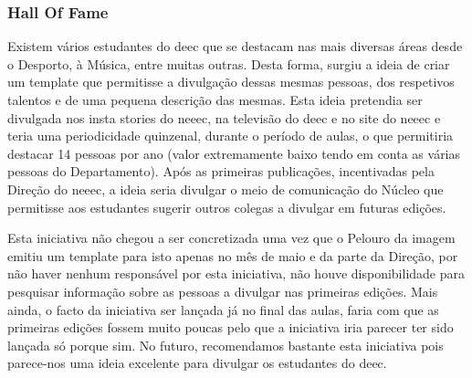 
\subsubsection{Hall Of Fame}

Existem vários estudantes do \acrshort{deec} que se destacam nas mais diversas áreas desde o Desporto, à Música, entre muitas outras. Desta forma, surgiu a ideia de criar um template que permitisse a divulgação dessas mesmas pessoas, dos respetivos talentos e de uma pequena descrição das mesmas. Esta ideia pretendia ser divulgada nos insta stories do \acrshort{neeec}, na televisão do \acrshort{deec} e no site do \acrshort{neeec} e teria uma periodicidade quinzenal, durante o período de aulas, o que permitiria destacar 14 pessoas por ano (valor extremamente baixo tendo em conta as várias pessoas do Departamento). Após as primeiras publicações, incentivadas pela Direção do \acrshort{neeec}, a ideia seria divulgar o meio de comunicação do Núcleo que permitisse aos estudantes sugerir outros colegas a divulgar em futuras edições.

Esta iniciativa não chegou a ser concretizada uma vez que o Pelouro da imagem emitiu um template para isto apenas no mês de maio e da parte da Direção, por não haver nenhum responsável por esta iniciativa, não houve disponibilidade para pesquisar informação sobre as pessoas a divulgar nas primeiras edições. Mais ainda, o facto da iniciativa ser lançada já no final das aulas, faria com que as primeiras edições fossem muito poucas pelo que a iniciativa iria parecer ter sido lançada só porque sim. No futuro, recomendamos bastante esta iniciativa pois parece-nos uma ideia excelente para divulgar os estudantes do \acrshort{deec}.